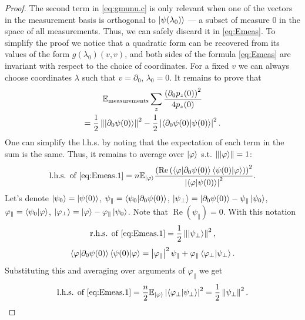 \documentclass[
  american,aps,pra,reprint,floatfix,nofootinbib,superscriptaddress
]{revtex4-2}
\DeclareMathOperator{\real}{Re}
\newcommand{\abs}[1]{\left|#1\right|}
\newcommand{\norm}[1]{\left\|#1\right\|}
\begin{document}
\begin{proof}
  The second term in \eqref{eq:gmunu.c} is only relevant when one of the
  vectors in the measurement basis is orthogonal to $\ket{\psi(\lambda_0)}$
  --- a subset of measure $0$ in the space of all measurements. Thus, we can
  safely discard it in \eqref{eq:Emeas}. To simplify the proof we notice that
  a quadratic form can be recovered from its values of the form
  $g(\lambda_0)(v, v)$,
  and both sides of the formula \eqref{eq:Emeas} are
  invariant with respect to the choice of coordinates.
  For a fixed $v$ we can always choose coordinates $\lambda$
  such that $v = \partial_0$, $\lambda_0 = 0$. It remains to prove that
  \begin{multline}
    \label{eq:Emeas.1}
    \mathbb{E}_{\textrm{measurements}}
    \sum_{z}
        \frac{
          \left(\partial_{0} p_z(0)\right)^2
        }{4 p_z(0)} \\
    = \frac12 \norm{\ket{\partial_{0} \psi(0)}}^2
        - \frac12 \abs{\braket{\partial_{0} \psi(0) | \psi(0)}}^2.
  \end{multline}
  One can simplify the l.h.s. by noting that the expectation of each term
  in the sum is the same. Thus, it remains to average over $\ket{\varphi}$
  s.t. $\norm{\ket{\varphi}} = 1$:
  \begin{multline}
    \textrm{l.h.s. of \eqref{eq:Emeas.1}}
    = n\mathbb{E}_{\ket{\varphi}}
      \frac{
        \left(\real\left(
        \braket{\varphi|\partial_{0} \psi(0)}
        \braket{\psi(0)|\varphi}\right)\right)^2
      }{\abs{\braket{\varphi|\psi(0)}}^2}.
  \end{multline}
  Let's denote
    $\ket{\psi_0} = \ket{\psi(0)}$,
    $\psi_\parallel = \braket{\psi_0|\partial_0\psi(0)}$,
    $\ket{\psi_\perp} = \ket{\partial_0\psi(0)} - \psi_\parallel\ket{\psi_0}$,
    $\varphi_\parallel = \braket{\psi_0|\varphi}$,
    $\ket{\varphi_\perp} = \ket{\varphi} - \varphi_\parallel\ket{\psi_0}$.
    Note that $\real(\psi_\parallel) = 0$.  With this notation
  \begin{equation}
    \textrm{r.h.s. of \eqref{eq:Emeas.1}} = \frac12 \norm{\ket{\psi_\perp}}^2,
  \end{equation}
  \begin{equation}
    \braket{\varphi|\partial_{0} \psi(0)} \braket{\psi(0)|\varphi} = 
    \abs{\varphi_\parallel}^2 \psi_\parallel
    + \varphi_\parallel \braket{\varphi_\perp|\psi_\perp}.
  \end{equation}
  Substituting this and averaging over arguments of $\varphi_\parallel$
  we get
  \begin{equation}
    \textrm{l.h.s. of \eqref{eq:Emeas.1}}
    = \frac{n}{2}\mathbb{E}_{\ket{\varphi}}
      \abs{\braket{\varphi_\perp|\psi_\perp}}^2
    = \frac12 \norm{\psi_\perp}^2.
  \end{equation}
\end{proof}
\end{document}
